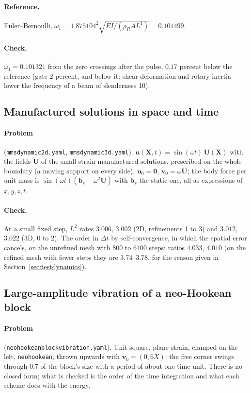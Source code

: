 \documentclass[11pt]{article}
\newcommand{\bX}{\bm{X}}
\newcommand{\bu}{\bm{u}}
\DeclareRobustCommand{\code}[1]{{\def\_{\textunderscore\allowbreak}\texttt{#1}}}
\DeclareRobustCommand{\file}[1]{{\def\_{\textunderscore\allowbreak}\texttt{#1}}}
\begin{document}
\paragraph{Reference.}  Euler--Bernoulli,
$\omega_1 = 1.875104^2\sqrt{EI/(\rho_R A L^4)} = 0.101499$.
\paragraph{Check.}  $\omega_1 = 0.101321$ from the zero crossings after the
pulse, $0.17$ percent below the reference (gate 2 percent, and below it:
shear deformation and rotary inertia lower the frequency of a beam of
slenderness 10).

\subsection{Manufactured solutions in space and time}
\paragraph{Problem} (\file{mms\_dynamic\_2d.yaml}, \file{mms\_dynamic\_3d.yaml}).
$\bu(\bX, t) = \sin(\omega t)\,\bm U(\bX)$ with the fields $\bm U$ of the
small-strain manufactured solutions, prescribed on the whole boundary (a
moving support on every side), $\bu_0 = \bm 0$, $\bm v_0 = \omega\bm U$; the
body force per unit mass is $\sin(\omega t)(\bm b_s - \omega^2\bm U)$ with
$\bm b_s$ the static one, all as expressions of $x, y, z, t$.
\paragraph{Check.}  At a small fixed step, $L^2$ rates $3.006$, $3.002$
(2D, refinements 1 to 3) and $3.012$, $3.022$ (3D, 0 to 2).  The order in
$\Delta t$ by self-convergence, in which the spatial error cancels, on the
unrefined mesh with 800 to 6400 steps: ratios $4.033$, $4.010$ (on the
refined mesh with fewer steps they are $3.74$--$3.78$, for the reason given
in Section~\ref{sec:testdynamics}).

\subsection{Large-amplitude vibration of a neo-Hookean block}
\paragraph{Problem} (\file{neo\_hookean\_block\_vibration.yaml}).  Unit
square, plane strain, clamped on the left, \code{neo\_hookean}, thrown
upwards with $\bm v_0 = (0, 6X)$: the free corner swings through $0.7$ of
the block's size with a period of about one time unit.  There is no closed
form; what is checked is the order of the time integration and what each
scheme does with the energy.
\end{document}
